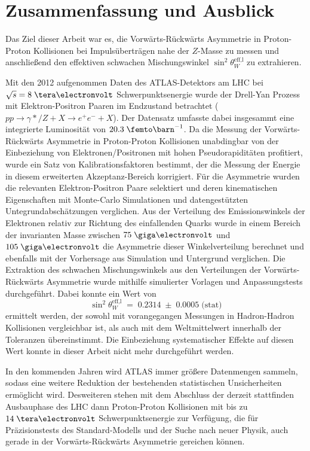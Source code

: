 

\chapter{Zusammenfassung und Ausblick}
\label{summary}

Das Ziel dieser Arbeit war es, die Vorwärts-Rückwärts Asymmetrie in
Proton-Proton Kollisionen bei Impulsüberträgen nahe der $Z$-Masse zu messen und
anschließend den effektiven schwachen Mischungswinkel
$\sin^2\theta_W^\text{eff,l}$ zu extrahieren.

Mit den 2012 aufgenommen Daten des ATLAS-Detektors am LHC bei $\sqrt{s}=8\TeV$
Schwerpunktsenergie wurde der Drell-Yan Prozess mit Elektron-Positron Paaren im
Endzustand betrachtet ($pp\rightarrow \gamma*/Z +X \rightarrow e^+e^-+X$). Der
Datensatz umfasste dabei insgesammt eine integrierte Luminosität von
$20.3\fb^{-1}$. Da die Messung der Vorwärts-Rückwärts Asymmetrie in
Proton-Proton Kollisionen unabdingbar von der Einbeziehung von
Elektronen/Positronen mit hohen Pseudorapiditäten profitiert, wurde ein Satz
von Kalibrationsfaktoren bestimmt, der die Messung der Energie in diesem
erweiterten Akzeptanz-Bereich korrigiert. Für die Asymmetrie wurden die
relevanten Elektron-Positron Paare selektiert und deren kinematischen
Eigenschaften mit Monte-Carlo Simulationen und datengestützten
Untegrundabschätzungen verglichen. Aus der Verteilung des Emissionswinkels der
Elektronen relativ zur Richtung des einfallenden Quarks wurde in einem Bereich
der invarianten Masse zwischen $75\GeV$ und $105\GeV$ die Asymmetrie dieser
Winkelverteilung berechnet und ebenfalls mit der Vorhersage aus Simulation und
Untergrund verglichen. Die Extraktion des schwachen Mischungswinkels aus den
Verteilungen der Vorwärts-Rückwärts Asymmetrie wurde mithilfe simulierter
Vorlagen  und Anpassungstests durchgeführt. Dabei konnte ein Wert von 
\begin{equation*}
    \sin^2\theta_W^\text{eff,l} \;=\; 0.2314
        \;\pm\; 0.0005 \;\text{(stat)}
\end{equation*}
ermittelt werden, der sowohl mit vorangegangen Messungen in Hadron-Hadron
Kollisionen vergleichbar ist, als auch mit dem Weltmittelwert innerhalb der
Toleranzen übereinstimmt. Die Einbeziehung systematischer Effekte auf diesen
Wert konnte in dieser Arbeit nicht mehr durchgeführt werden.

In den kommenden Jahren wird ATLAS immer größere Datenmengen sammeln, sodass
eine weitere Reduktion der bestehenden statistischen Unsicherheiten ermöglicht
wird.  Desweiteren stehen mit dem Abschluss der derzeit stattfinden Ausbauphase
des \ac{LHC} dann Proton-Proton Kollisionen mit bis zu $14\TeV$
Schwerpunktsenergie zur Verfügung, die für Präzisionstests des Standard-Modells
und der Suche nach neuer Physik, auch gerade in der Vorwärts-Rückwärts
Asymmetrie gereichen können. 
